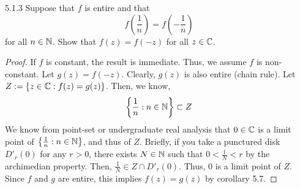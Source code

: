 \documentclass[12pt]{amsart}
\begin{document}
\begin{problem}{5.1.3}
    Suppose that $f$ is entire and that 
    \[ f\left(\frac{1}{n}\right) = f\left(-\frac{1}{n}\right)\]
    for all $n \in \mathbb N$. Show that $f(z) = f(-z)$ for all $z \in \mathbb C$. 
\end{problem}
\begin{proof}
    If $f$ is constant, the result is immediate. Thus, we assume $f$ is non-constant. Let $g(z) = f(-z)$. Clearly, $g(z)$ is also entire (chain rule). Let $Z := \{ z \in \mathbb C : f(z) = g(z)\}$. Then, we know, 
    \[ \left\{\frac{1}{n} : n \in \mathbb N\right\} \subset Z\]
    We know from point-set or undergraduate real analysis that $0 \in \mathbb C$ is a limit point of $\left\{\frac{1}{n} : n \in \mathbb N\right\}$, and thus of $Z$. Briefly, if you take a punctured disk $D'_r(0)$ for any $r > 0$, there exists $N \in \mathbb N$ such that $0 < \frac{1}{N} < r$ by the archimedian property. Then, $\frac{1}{N} \in Z \cap D'_r(0)$. Thus, $0$ is a limit point of $Z$. Since $f$ and $g$ are entire, this implies $f(z) = g(z)$ by corollary 5.7. 
\end{proof}
\end{document}
